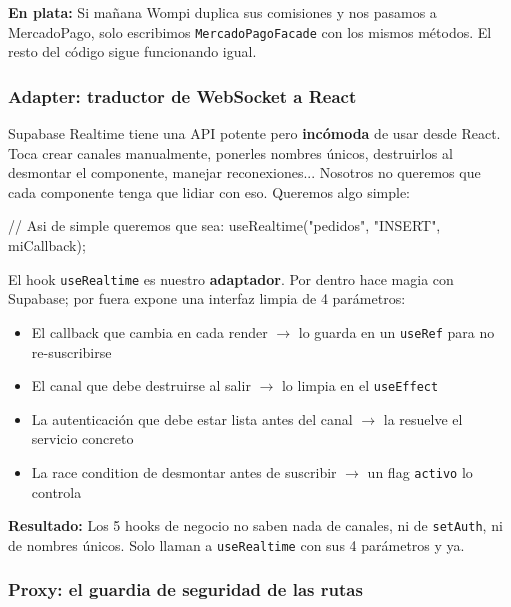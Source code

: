 \documentclass[12pt,a4paper]{article}
\begin{document}
\begin{tipbox}
\textbf{En plata:} Si mañana Wompi duplica sus comisiones y nos pasamos a MercadoPago, solo escribimos \texttt{MercadoPagoFacade} con los mismos métodos. El resto del código sigue funcionando igual.
\end{tipbox}

\subsubsection{Adapter: traductor de WebSocket a React}

Supabase Realtime tiene una API potente pero \textbf{incómoda} de usar desde React. Toca crear canales manualmente, ponerles nombres únicos, destruirlos al desmontar el componente, manejar reconexiones... Nosotros no queremos que cada componente tenga que lidiar con eso. Queremos algo simple:

\begin{codeblock}
// Asi de simple queremos que sea:
useRealtime("pedidos", "INSERT", miCallback);
\end{codeblock}

El hook \texttt{useRealtime} es nuestro \textbf{adaptador}. Por dentro hace magia con Supabase; por fuera expone una interfaz limpia de 4 parámetros:

\begin{itemize}[itemsep=2pt]
  \item El callback que cambia en cada render $\rightarrow$ lo guarda en un \texttt{useRef} para no re-suscribirse
  \item El canal que debe destruirse al salir $\rightarrow$ lo limpia en el \texttt{useEffect}
  \item La autenticación que debe estar lista antes del canal $\rightarrow$ la resuelve el servicio concreto
  \item La race condition de desmontar antes de suscribir $\rightarrow$ un flag \texttt{activo} lo controla
\end{itemize}

\begin{tipbox}
\textbf{Resultado:} Los 5 hooks de negocio no saben nada de canales, ni de \texttt{setAuth}, ni de nombres únicos. Solo llaman a \texttt{useRealtime} con sus 4 parámetros y ya.
\end{tipbox}

\subsubsection{Proxy: el guardia de seguridad de las rutas}
\end{document}
